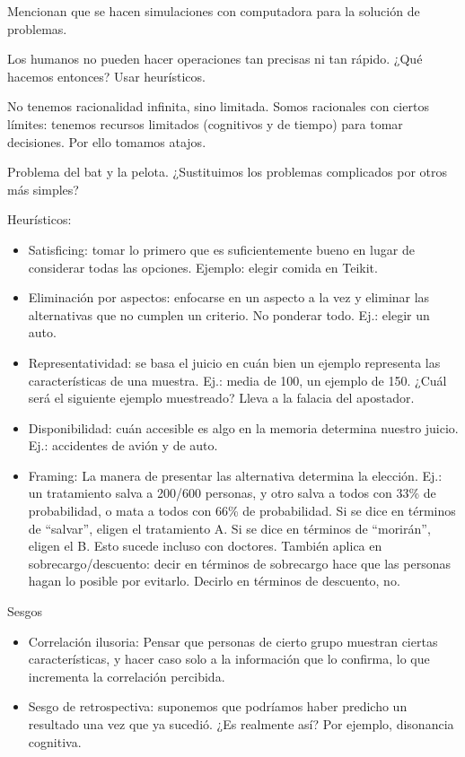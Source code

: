 \documentclass[a4paper,12pt]{article}
\begin{document}
Mencionan que se hacen simulaciones con computadora para la solución de problemas.

Los humanos no pueden hacer operaciones tan precisas ni tan rápido. ¿Qué hacemos entonces? Usar heurísticos.

No tenemos racionalidad infinita, sino limitada. Somos racionales con ciertos límites: tenemos recursos limitados (cognitivos y de tiempo) para tomar decisiones. Por ello tomamos atajos.

Problema del bat y la pelota. ¿Sustituimos los problemas complicados por otros más simples?

Heurísticos:
\begin{itemize}
	\item Satisficing: tomar lo primero que es suficientemente bueno en lugar de considerar todas las opciones. Ejemplo: elegir comida en Teikit.
	\item Eliminación por aspectos: enfocarse en un aspecto a la vez y eliminar las alternativas que no cumplen un criterio. No ponderar todo. Ej.: elegir un auto.
	\item Representatividad: se basa el juicio en cuán bien un ejemplo representa las características de una muestra. Ej.: media de 100, un ejemplo de 150. ¿Cuál será el siguiente ejemplo muestreado?
		Lleva a la falacia del apostador.
	\item Disponibilidad: cuán accesible es algo en la memoria determina nuestro juicio. Ej.: accidentes de avión y de auto.
	\item Framing: La manera de presentar las alternativa determina la elección. Ej.: un tratamiento salva a 200/600 personas, y otro salva a todos con 33\% de probabilidad, o mata a todos con 66\% de probabilidad. Si se dice en términos de ``salvar'', eligen el tratamiento A. Si se dice en términos de ``morirán'', eligen el B. Esto sucede incluso con doctores. También aplica en sobrecargo/descuento: decir en términos de sobrecargo hace que las personas hagan lo posible por evitarlo. Decirlo en términos de descuento, no.
\end{itemize}

Sesgos
\begin{itemize}
	\item Correlación ilusoria: Pensar que personas de cierto grupo muestran ciertas características, y hacer caso solo a la información que lo confirma, lo que incrementa la correlación percibida.
	\item Sesgo de retrospectiva: suponemos que podríamos haber predicho un resultado una vez que ya sucedió. ¿Es realmente así? Por ejemplo, disonancia cognitiva.
\end{itemize}
\end{document}
